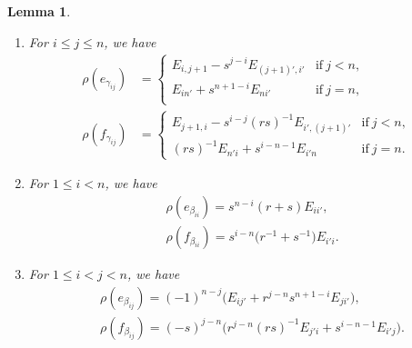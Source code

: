 \documentclass[10pt,a4paper]{amsart}
\numberwithin{equation}{section}
\newtheorem{Lemma}[Theorem]{Lemma}
\begin{document}
\begin{Lemma}\label{lem:C-allroots}\quad
\begin{enumerate}\itemsep=0pt
\item[$(a)$] For $i \le j \le n$, we have
\begin{displaymath}
\begin{split}
 \rho(e_{\gamma_{ij}}) &=
 \begin{cases}
 E_{i,j + 1} - s^{j - i}E_{(j + 1)',i'} & \text{if}\ j < n, \\
 E_{in'} + s^{n + 1 - i}E_{ni'} & \text{if}\ j = n,\\
 \end{cases} \\
 \rho(f_{\gamma_{ij}}) &=
 \begin{cases}
 E_{j + 1,i} - s^{i - j}(rs)^{-1}E_{i',(j+1)'} & \text{if}\ j < n ,\\
 (rs)^{-1}E_{n'i} + s^{i - n - 1}E_{i'n} & \text{if}\ j = n.
 \end{cases}
\end{split}
\end{displaymath}

\item[$(b)$] For $1 \le i < n$, we have
\begin{displaymath}
\begin{split}
 & \rho(e_{\beta_{ii}}) = s^{n-i}(r +s) E_{ii'}, \\
 & \rho(f_{\beta_{ii}}) = s^{i - n}\bigl(r^{-1} + s^{-1}\bigr)E_{i'i}.
\end{split}
\end{displaymath}

\item[$(c)$] For $1 \le i < j < n$, we have
\begin{displaymath}
\begin{split}
 & \rho(e_{\beta_{ij}}) = (-1)^{n-j}\bigl(E_{ij'} + r^{j-n}s^{n + 1 - i}E_{ji'}\bigr) , \\
 & \rho(f_{\beta_{ij}}) = (-s)^{j-n}\bigl(r^{j - n}(rs)^{-1}E_{j'i} + s^{i - n- 1}E_{i'j}\bigr) .
\end{split}
\end{displaymath}
\end{enumerate}
\end{Lemma}
\end{document}
